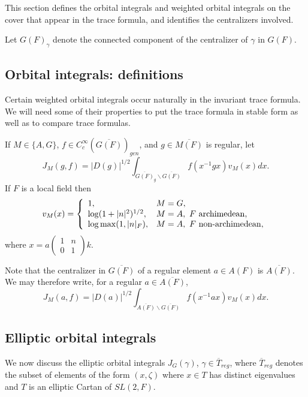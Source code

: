 \documentclass[12pt,letterpaper,openany]{book}
\theoremstyle{plain}
\theoremstyle{definition}
\theoremstyle{remark}
\theoremstyle{remark}
\begin{document}
This section defines the orbital integrals and weighted orbital integrals on the cover that appear in the trace formula, and identifies the centralizers involved.


Let $G(F)_\gamma$ denote the connected component of the centralizer of
$\gamma$ in $G(F)$.

\subsection{Orbital integrals: definitions}\label{sec:weighted-defs}

Certain weighted orbital integrals occur naturally in the invariant trace
formula. We will need some of their properties to put the trace formula in
stable form as well as to compare trace formulas.

If $M\in \{A,G\}$, $f\in C_c^\infty (\overline{G(F)})_{gen}$, and $g\in
\overline{M(F)}$ is regular, let
\[
J_M(g,f)=|D(g)|^{1/2}
\int_{\overline{G(F)}_g\backslash \overline{G(F)}}
f(x^{-1}gx)v_M(x)dx.
\]
If $F$ is a local field then
\[
v_M(x)=\left\{
\begin{array}{ll}
1, & M=G, \\
\log (1+|n|^2)^{1/2}, & M=A,\ F\ {\rm archimedean},\\
\log \max(1,|n|_F), & M=A,\ F\ {\rm non\hbox{-}archimedean},
\end{array}
\right.
\]
where $x=a\left(
\begin{array}{cc}
1 & n \\
0 & 1
\end{array}
\right) k$.

Note that the centralizer in $\overline{G(F)}$ of a regular element
$a\in A(F)$ is $\overline{A(F)}$. We may therefore write,
for a regular $a\in \overline{A(F)}$,
\begin{equation}
J_M(a,f)=
|D(a)|^{1/2}\int_{\overline{A(F)}\backslash \overline{G(F)}}
f(x^{-1}ax)v_M(x)dx.
\end{equation}

\subsection{Elliptic orbital integrals}

We now discuss the elliptic orbital integrals $J_G(\gamma)$,
$\gamma\in \overline{T}_{reg}$, where $\overline{T}_{reg}$
denotes the subset of elements of the form $(x,\zeta)$
where $x\in T$ has distinct eigenvalues and $T$ is an elliptic
Cartan of $SL(2,F)$.
\end{document}
